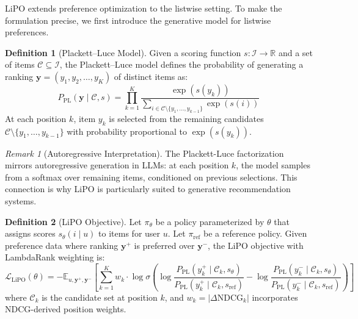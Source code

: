\documentclass[11pt,a4paper]{article}
\theoremstyle{definition}
\newtheorem{definition}{Definition}[section]
\theoremstyle{plain}
\theoremstyle{remark}
\newtheorem{remark}{Remark}[section]
\newcommand{\R}{\mathbb{R}}
\newcommand{\E}{\mathbb{E}}
\newcommand{\NDCG}{\mathrm{NDCG}}
\begin{document}
LiPO \cite{liu2024lipo} extends preference optimization to the listwise setting. To make the formulation precise, we first introduce the generative model for listwise preferences.

\begin{definition}[Plackett--Luce Model]
\label{def:plackett_luce}
Given a scoring function $s: \mathcal{I} \rightarrow \R$ and a set of items $\mathcal{C} \subseteq \mathcal{I}$, the Plackett--Luce model defines the probability of generating a ranking $\bm{y} = (y_1, y_2, \ldots, y_K)$ of distinct items as:
\begin{equation}
    P_{\text{PL}}(\bm{y} \mid \mathcal{C}, s) = \prod_{k=1}^{K} \frac{\exp(s(y_k))}{\sum_{i \in \mathcal{C} \setminus \{y_1, \ldots, y_{k-1}\}} \exp(s(i))}
\end{equation}
At each position $k$, item $y_k$ is selected from the remaining candidates $\mathcal{C} \setminus \{y_1, \ldots, y_{k-1}\}$ with probability proportional to $\exp(s(y_k))$.
\end{definition}

\begin{remark}[Autoregressive Interpretation]
The Plackett-Luce factorization mirrors autoregressive generation in LLMs: at each position $k$, the model samples from a softmax over remaining items, conditioned on previous selections. This connection is why LiPO is particularly suited to generative recommendation systems.
\end{remark}

\begin{definition}[LiPO Objective]
\label{def:lipo}
Let $\pi_\theta$ be a policy parameterized by $\theta$ that assigns scores $s_\theta(i \mid u)$ to items for user $u$. Let $\pi_{\text{ref}}$ be a reference policy. Given preference data where ranking $\bm{y}^+$ is preferred over $\bm{y}^-$, the LiPO objective with LambdaRank weighting is:
\begin{equation}
    \mathcal{L}_{\text{LiPO}}(\theta) = -\E_{u, \bm{y}^+, \bm{y}^-} \left[ \sum_{k=1}^{K} w_k \cdot \log \sigma\left( \log \frac{P_{\text{PL}}(y_k^+ \mid \mathcal{C}_k, s_\theta)}{P_{\text{PL}}(y_k^+ \mid \mathcal{C}_k, s_{\text{ref}})} - \log \frac{P_{\text{PL}}(y_k^- \mid \mathcal{C}_k, s_\theta)}{P_{\text{PL}}(y_k^- \mid \mathcal{C}_k, s_{\text{ref}})} \right) \right]
\end{equation}
where $\mathcal{C}_k$ is the candidate set at position $k$, and $w_k = |\Delta \NDCG_k|$ incorporates NDCG-derived position weights.
\end{definition}
\end{document}
